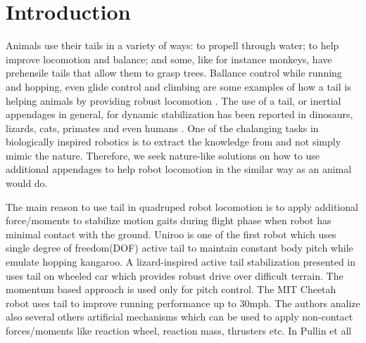 \section{Introduction}\label{sec:introduction}

Animals use their tails in a variety of ways: to propell through water; to help improve locomotion and balance; and some, like for instance monkeys, have prehensile tails that allow them to grasp trees. Ballance control while running and hopping, even glide control and climbing are some examples of how a tail is helping animals by providing robust locomotion \cite{Thomas:Nature2012}. The use of a tail, or inertial appendages in general, for dynamic stabilization has been reported in dinosaurs, lizards, cats, primates and even humans \cite{ostrom1969osteology,PijnappelsSringer,Walker199841,JusufiIOP2010}. One of the chalanging tasks in biologically inspired robotics is to extract the knowledge from and not simply mimic the nature. Therefore, we seek nature-like solutions on how to use additional appendages to help robot locomotion in the similar way as an animal would do.  

The main reason to use tail in quadruped robot locomotion is to apply additional force/moments to stabilize motion gaits during flight phase when robot has minimal contact with the ground. Uniroo \cite{zeglin1991uniroo} is one of the first robot which uses single degree of freedom(DOF) active tail to maintain constant body pitch while emulate hopping kangaroo. A lizard-inspired active tail stabilization presented in \cite{conf/iros/Chang-SiuLTF11} uses tail on wheeled car which provides robust drive over difficult terrain. The momentum based approach is used only for pitch control. The MIT Cheetah robot \cite{DBLP:conf/iros/BriggsLHK12} uses tail to improve running performance up to 30mph. The authors analize also several others artificial mechanisms which can be used to apply non-contact forces/moments like reaction wheel, reaction mass, thrusters etc. In \cite{PullinICRA12} Pullin et all 

